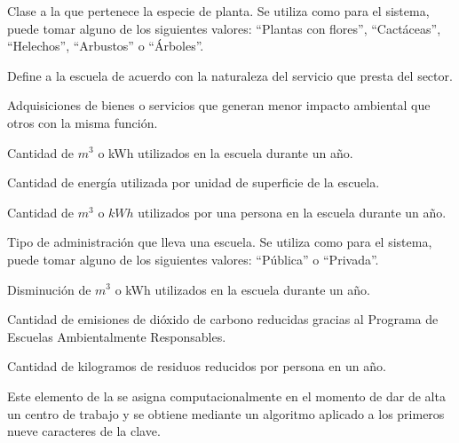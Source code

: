 \begin{description}
     Clase a la que pertenece la especie de planta. Se utiliza como  para el sistema, puede tomar alguno de los siguientes valores: ``Plantas con flores'', ``Cactáceas'', ``Helechos'', ``Arbustos'' o ``Árboles''.

     Define a la escuela de acuerdo con la naturaleza del servicio que presta del sector. %
    
     Adquisiciones de bienes o servicios que generan menor impacto ambiental que otros con la misma función.
    
     Cantidad de $m^3$ o kWh utilizados en la escuela durante un año.
    
     Cantidad de energía utilizada por unidad de superficie de la escuela.
    
     Cantidad de $m^3$ o $kWh$ utilizados por una persona en la escuela durante un año.

     Tipo de administración que lleva una escuela. Se utiliza como  para el sistema, puede tomar alguno de los siguientes valores: ``Pública'' o ``Privada''.
    
    
     Disminución de $m^3$ o kWh utilizados en la escuela durante un año.
    
     Cantidad de emisiones de dióxido de carbono reducidas gracias al Programa de Escuelas Ambientalmente Responsables.
    
     Cantidad de kilogramos de residuos reducidos por persona en un año.
    
     Este elemento de la  se asigna computacionalmente en el momento de dar de alta un centro de trabajo y se obtiene mediante un algoritmo aplicado a los primeros nueve caracteres de la clave.


\end{description}
